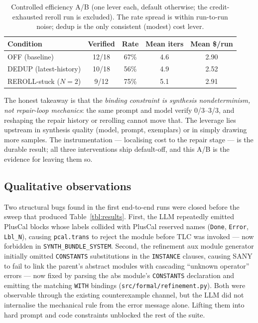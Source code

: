 \documentclass[11pt]{article}
\begin{document}
\begin{table}[t]
\centering\small
\begin{tabular}{lcccc}
\toprule
Condition & Verified & Rate & Mean iters & Mean \$/run \\
\midrule
OFF (baseline)                      & 12/18 & 67\% & 4.6 & 2.90 \\
DEDUP (latest-history)              & 10/18 & 56\% & 4.9 & 2.52 \\
REROLL-stuck ($N{=}2$)              & 9/12  & 75\% & 5.1 & 2.91 \\
\bottomrule
\end{tabular}
\caption{Controlled efficiency A/B (one lever each, default otherwise; the
credit-exhausted reroll run is excluded). The rate spread is within run-to-run
noise; dedup is the only consistent (modest) cost lever.}
\label{tbl:ab}
\end{table}

The honest takeaway is that the \emph{binding constraint is synthesis
nondeterminism, not repair-loop mechanics}: the same prompt and model verify
0/3--3/3, and reshaping the repair history or rerolling cannot move that. The
leverage lies upstream in synthesis quality (model, prompt, exemplars) or in simply
drawing more samples. The instrumentation --- localising cost to the repair stage
--- is the durable result; all three interventions ship default-off, and this A/B is
the evidence for leaving them so.

\subsection{Qualitative observations}\label{ssec:qual}
Two structural bugs found in the first end-to-end runs were closed
before the sweep that produced Table~\ref{tbl:results}. First, the
LLM repeatedly emitted PlusCal blocks whose labels collided with
PlusCal reserved names (\texttt{Done}, \texttt{Error},
\texttt{Lbl\_N}), causing \texttt{pcal.trans} to reject the module
before TLC was invoked --- now forbidden in
\texttt{SYNTH\_BUNDLE\_SYSTEM}. Second, the refinement aux module
generator initially omitted \texttt{CONSTANTS} substitutions in the
\texttt{INSTANCE} clauses, causing SANY to fail to link the parent's
abstract modules with cascading ``unknown operator'' errors --- now
fixed by parsing the abs module's \texttt{CONSTANTS} declaration and
emitting the matching \texttt{WITH} bindings
(\texttt{src/formal/refinement.py}). Both were observable through
the existing counterexample channel, but the LLM did not internalise
the mechanical rule from the error message alone. Lifting them into
hard prompt and code constraints unblocked the rest of the suite.
\end{document}
